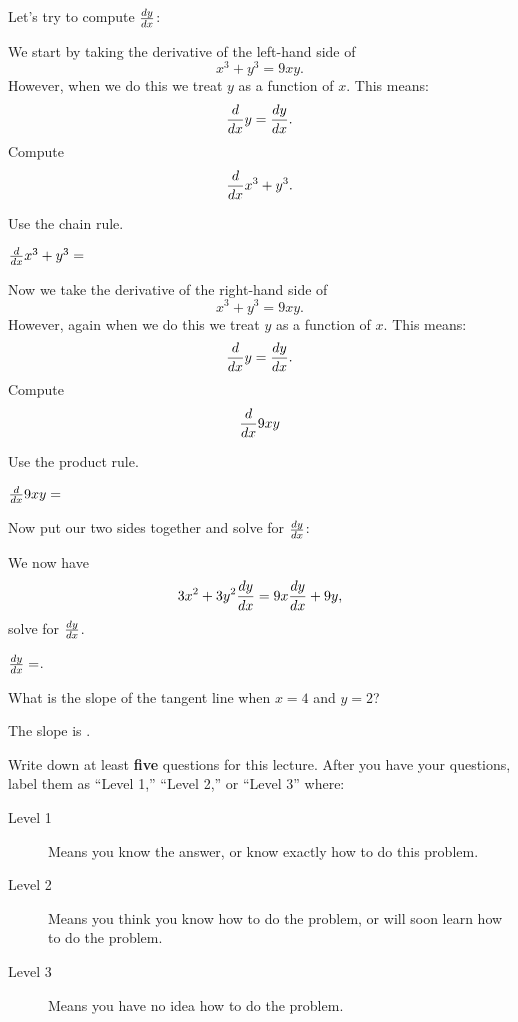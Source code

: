 \documentclass{ximera}
\begin{document}
Let's try to compute $\frac{dy}{dx}$:


\begin{question}
We start by taking the derivative of the left-hand side of 
\[
x^3+y^3 = 9xy.
\]
However, when we do this we treat $y$ as a function of $x$. This means:
\[
\frac{d}{dx} y = \frac{dy}{dx}.
\]
Compute 
\[
\frac{d}{dx} x^3+y^3.
\]
\begin{hint}
Use the chain rule.
\end{hint}
\begin{prompt}
$\frac{d}{dx} x^3+y^3 = $
\end{prompt}
\end{question}

\begin{question}
Now we take the derivative of the right-hand side of 
\[
x^3+y^3 = 9xy.
\]
However, again when we do this we treat $y$ as a function of $x$. This
means:
\[
\frac{d}{dx} y = \frac{dy}{dx}.
\]
Compute 
\[
\frac{d}{dx} 9xy
\]
\begin{hint}
Use the product rule.
\end{hint}
\begin{prompt}
$\frac{d}{dx} 9xy= $
\end{prompt}
\end{question}


\begin{question}
Now put our two sides together and solve for $\frac{dy}{dx}$:
\begin{hint}
We now have 
\[
3x^2 + 3y^2\frac{dy}{dx}= 9x\frac{dy}{dx} + 9y,
\]
solve for $\frac{dy}{dx}$.
\end{hint}
\begin{prompt}
$\frac{dy}{dx}=$.
\end{prompt}
\end{question}


\begin{question}
What is the slope of the tangent line when $x=4$ and $y=2$?
\begin{prompt}
The slope is .
\end{prompt}
\end{question}


\begin{question}
Write down at least \textbf{five} questions for this lecture. After
you have your questions, label them as ``Level 1,'' ``Level 2,'' or ``Level 3'' where:
\begin{description}
\item[Level 1] Means you know the answer, or know exactly how to do this problem.
\item[Level 2] Means you think you know how to do the problem, or will soon learn how to do the problem.
\item[Level 3] Means you have no idea how to do the problem. 
\end{description}
  \begin{freeResponse}
  \end{freeResponse}
\end{question}
\end{document}
